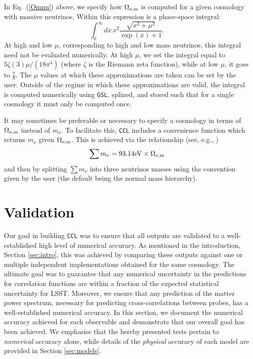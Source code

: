 \documentclass[\docopts]{\docclass}
\newcommand{\ccl}{{\tt CCL}\xspace}
\begin{document}
In Eq.~(\ref{Omnu}) above, we specify how $\Omega_{\nu, {\rm m}}$ is computed for a given cosmology with massive neutrinos. Within this expression is a phase-space integral:
\begin{equation}
\int_0^{\infty} dx \, x^2 \frac{\sqrt{x^2 + \mu^2}}{\exp(x) + 1}.
\label{phasespacenu}
\end{equation}
At high and low $\mu$, corresponding to high and low mass neutrinos, this integral need not be evaluated numerically. At high $\mu$, we set the integral equal to $5\zeta(3)\mu/(18\pi^4)$ (where $\zeta$ is the Riemann zeta function), while at low $\mu$, it goes to $\frac{7}{8}$. The $\mu$ values at which these approximations are taken can be set by the user. Outside of the regime in which these approximations are valid, the integral is computed numerically using {\tt GSL}, splined, and stored such that for a single cosmology it must only be computed once.

It may sometimes be preferable or necessary to specify a cosmology in terms of $\Omega_{\nu, {\rm m}}$ instead of $m_\nu$. To facilitate this, \ccl includes a convenience function which returns $m_\nu$ given $\Omega_{\nu, {\rm m}}$. This is achieved via the relationship (see, e.g., \citealt{Lesgourgues2012})
\begin{equation}
\sum m_\nu = 93.14 {\rm eV} \times \Omega_{\nu, {\rm m}}
\label{summnu_om}
\end{equation}
and then by splitting $\sum m_\nu$ into three neutrinos masses using the convention given by the user (the default being the normal mass hierarchy).


\section{Validation}
\label{sec:validation}

Our goal in building \ccl was to ensure that all outputs are validated to a well-established high level of numerical accuracy. As mentioned in the introduction, Section \ref{sec:intro}, this was achieved by comparing these outputs against one or multiple independent implementations obtained for the same cosmology. The ultimate goal was to guarantee that any numerical uncertainty in the predictions for correlation functions are within a fraction of the expected statistical uncertainty for LSST. Moreover, we ensure that any prediction of the matter power spectrum, necessary for predicting cross-correlations between probes, has a well-established numerical accuracy. In this section, we document the numerical accuracy achieved for each observable and demonstrate that our overall goal has been achieved. We emphasise that the hereby presented tests pertain to {\it numerical} accuracy alone, while details of the {\it physical} accuracy of each model are provided in Section \ref{sec:models}. 
\end{document}
